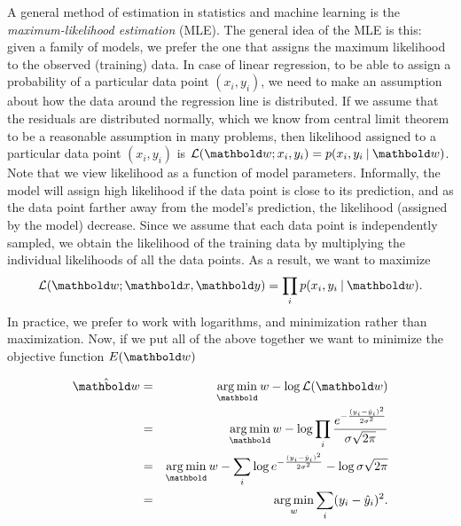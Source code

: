 A general method of estimation in statistics and machine learning is
the \emph{maximum-likelihood estimation} (MLE).
The general idea of the MLE is this: given a family of models,
we prefer the one that assigns the maximum likelihood
to the observed (training) data.
In case of linear regression,
to be able to assign a probability of a particular data point $(x_{i}, y_{i})$,
we need to make an assumption about how the data around the regression line
is distributed.
If we assume that the residuals are distributed normally,
which we know from central limit theorem
to be a reasonable assumption in many problems,
then likelihood assigned to a particular data point $(x_{i}, y_{i})$
is $\mathcal{L}(\vect{w;x_{i}, y_{i}}) = p(x_{i}, y_{i}\given{}\vect{w})$.
Note that we view likelihood as a function of model parameters.
Informally, the model will assign high likelihood
if the data point is close to its prediction,
and as the data point farther away from the model's prediction,
the likelihood (assigned by the model) decrease.
Since we assume that each data point is independently sampled,
we obtain the likelihood of the training data by multiplying
the individual likelihoods of all the data points.
As a result, we want to maximize
\begin{equation*}
  \mathcal{L}(\vect{w;\vect{x}, \vect{y}}) =
      \prod_{i}  p(x_{i}, y_{i}\given{}\vect{w}) .
\end{equation*}
In practice, we prefer to work with logarithms,
and minimization rather than maximization.%
Now, if we put all of the above together we want to minimize 
the objective function $E(\vect{w})$

\begin{equation*}
  \begin{aligned}
    \hat{\vect{w}} &=& \argmin_\vect{w} - \log \mathcal{L}(\vect{w})\\
         &=& \argmin_\vect{w} - \log \prod_{i} \frac{%
          e^{-\frac{(y_{i} - \hat{y}_{i})^{2}}{2\sigma^{2}}}}%
          {\sigma\sqrt{2\pi}}\\
         &=& \argmin_\vect{w} - \sum_{i} \log e^{-\frac{(y_{i}%
                  - \hat{y}_{i})^{2}}{2\sigma^{2}}} -
           \log {\sigma\sqrt{2\pi}}\\
         &=& \argmin_{w} \sum_{i} (y_{i} - \hat{y}_{i})^{2}.
  \end{aligned}
\end{equation*}


